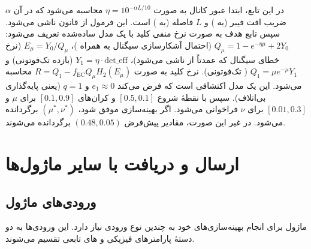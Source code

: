 در این تابع، ابتدا عبور کانال به صورت $\eta = 10^{-\alpha L / 10}$ محاسبه می‌شود که در آن $\alpha$ ضریب افت فیبر (به ) و $L$ فاصله (به ) است. این فرمول از قانون  ناشی می‌شود. سپس تابع هدف به صورت نرخ منفی کلید با یک مدل ساده‌شده تعریف می‌شود: $Q_\mu = 1 - e^{-\eta \mu} + 2 Y_0$ (احتمال آشکارسازی سیگنال به همراه )، $E_\mu = Y_0 / Q_\mu$ (نرخ خطای سیگنال که عمدتاً از  ناشی می‌شود)، $Y_1 = \eta \cdot \text{det\_eff}$ (بازده تک‌فوتونی) و $Q_1 = \mu e^{-\mu} Y_1$ ( تک‌فوتونی). نرخ کلید به صورت $R = Q_1 - f_{\text{EC}} Q_\mu H_2(E_\mu)$ محاسبه می‌شود. این یک مدل اکتشافی است که فرض می‌کند $e_1 \approx 0$ و $q = 1$ (یعنی پایه‌گذاری بی‌اتلاف). سپس  با نقطۀ شروع $[0.5, 0.1]$ و کران‌های $[0.1, 0.9]$ برای $\mu$ و $[0.01, 0.3]$ برای $\nu$ فراخوانی می‌شود. اگر بهینه‌سازی موفق شود، $(\mu^*, \nu^*)$ برگردانده می‌شود. در غیر این صورت، مقادیر پیش‌فرض $(0.48, 0.05)$ برگردانده می‌شوند.

\section{ارسال و دریافت با سایر ماژول‌ها}

\subsection{ورودی‌های ماژول}

ماژول  برای انجام بهینه‌سازی‌های خود به چندین نوع ورودی نیاز دارد. این ورودی‌ها به دو دستۀ پارامترهای فیزیکی و ‌های تابعی تقسیم می‌شوند.

